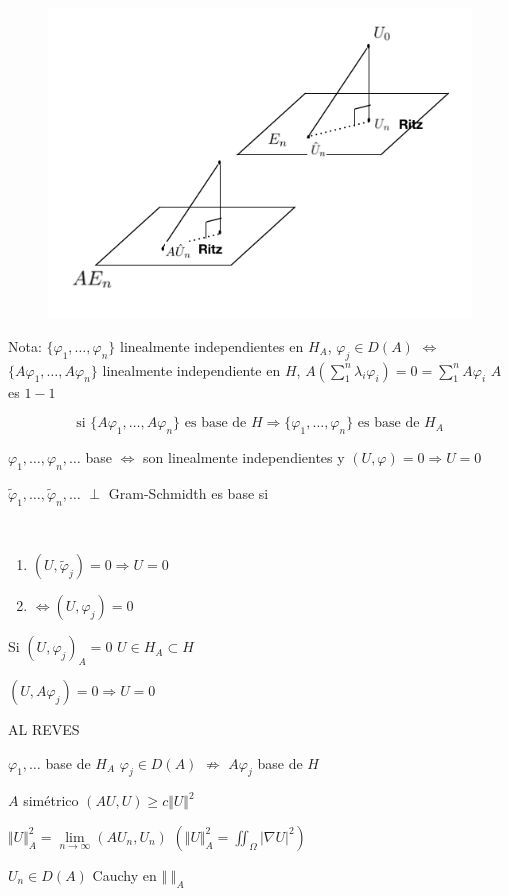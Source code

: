 \documentclass[a4paper,10pt]{book}
\begin{document}
\begin{enumerate}
\begin{figure}[H]
    \centering
    \includegraphics[width=0.5\linewidth]{Screen Shot 2024-03-17 at 18.25.51.png}
    \caption{}
    \label{fig:7}
\end{figure}

Nota: $\{ \varphi_1,\ldots, \varphi_n\}$ linealmente independientes en $H_A$, $\varphi_j\in D(A)$ $\Leftrightarrow$  $\{ A\varphi_1,\ldots, A\varphi_n\}$ 
linealmente independiente en $H$, $A \left( \sum\limits_1^n \lambda_i \varphi_i \right) =0 = \sum\limits_1^n A\varphi_i $ $A$ es $1-1$ 

\[\boxed{ \text{si } \{ A\varphi_1,\ldots, A\varphi_n\} \text{ es base de } H } \Rightarrow \boxed{ \{ \varphi_1,\ldots, \varphi_n\} \text{ es base de  } H_A} \]

$\varphi_1,\ldots,\varphi_n, \ldots $ base $\Leftrightarrow$ son linealmente independientes y $(U,\varphi)=0 \Rightarrow U=0$

$\tilde{\varphi}_1,\ldots,\tilde{\varphi}_n, \ldots $ $\perp$ Gram-Schmidth es base si 

\
\begin{enumerate}
    \item $(U,\tilde{\varphi}_j)=0 \Rightarrow U=0$
    \item $\Leftrightarrow (U,\varphi_j)=0$ 
\end{enumerate}

Si $(U,\varphi_j)_A =0$  $U\in H_A \subset H$ 

$(U,A\varphi_j)=0 \Rightarrow U=0$

AL REVES

$\varphi_1,\ldots$ base de $H_A$ $\varphi_j\in D(A) $  $\nRightarrow $  $A\varphi_j$ base de $H$

$A$ simétrico $(AU,U)\geq c \Vert U\Vert^2$

$\Vert U\Vert_A^2 = \underset{n\rightarrow\infty }{\lim} (AU_n,U_n)$  $\left( \Vert U\Vert_A^2 =\iint_\Omega |\nabla U|^2\right)$

$U_n \in D(A) $ Cauchy en $\Vert \;\Vert_A$


\end{enumerate}
\end{document}
